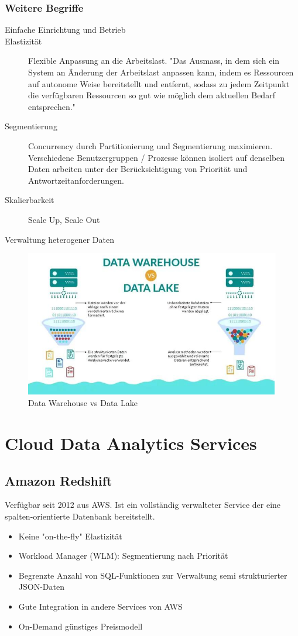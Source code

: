 \documentclass[../Main.tex]{subfiles}
\begin{document}
\subsubsection{Weitere Begriffe}
\begin{description}
    \item[Einfache Einrichtung und Betrieb]
    \item[Elastizität] Flexible Anpassung an die Arbeitslast.
    "Das Ausmass, in dem sich ein System an Änderung der Arbeitslast anpassen kann,
    indem es Ressourcen auf autonome Weise bereitstellt und entfernt, sodass zu jedem
    Zeitpunkt die verfügbaren Ressourcen so gut wie möglich dem aktuellen Bedarf entsprechen."
    \item[Segmentierung] Concurrency durch Partitionierung und Segmentierung maximieren.
    Verschiedene Benutzergruppen / Prozesse können isoliert auf denselben Daten arbeiten unter
    der Berücksichtigung von Priorität und Antwortzeitanforderungen.
    \item[Skalierbarkeit] Scale Up, Scale Out
    \item[Verwaltung heterogener Daten] 
\end{description}

\begin{figure}[H]
    \centering
    \includegraphics[width=0.5\linewidth]{Images/datan/dw-vs-dl.png}
    \caption{Data Warehouse vs Data Lake}
\end{figure}

\section{Cloud Data Analytics Services}
\subsection{Amazon Redshift}
Verfügbar seit 2012 aus AWS. Ist ein vollständig verwalteter Service der eine spalten-orientierte Datenbank bereitstellt.
\begin{itemize}
    \item Keine "on-the-fly" Elastizität
    \item Workload Manager (WLM): Segmentierung nach Priorität
    \item Begrenzte Anzahl von SQL-Funktionen zur Verwaltung semi
    strukturierter JSON-Daten
    \item Gute Integration in andere Services von AWS
    \item On-Demand günstiges Preismodell
\end{itemize}
\end{document}
